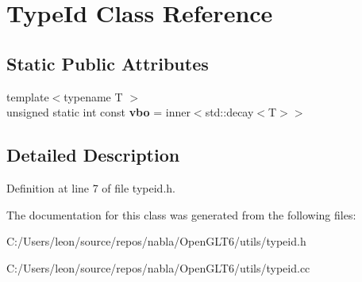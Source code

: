 \hypertarget{class_type_id}{}\section{Type\+Id Class Reference}
\label{class_type_id}
\subsection*{Static Public Attributes}
\begin{DoxyCompactItemize}
\item 
\mbox{\label{class_type_id_abf385f40cbb873ea099a0a9f9c4339d5}} 
{\footnotesize template$<$typename T $>$ }\\unsigned static int const {\bfseries vbo} = inner$<$std\+::decay$<$T$>$$>$
\end{DoxyCompactItemize}


\subsection{Detailed Description}


Definition at line 7 of file typeid.\+h.



The documentation for this class was generated from the following files\+:\begin{DoxyCompactItemize}
\item 
C\+:/\+Users/leon/source/repos/nabla/\+Open\+G\+L\+T6/utils/typeid.\+h\item 
C\+:/\+Users/leon/source/repos/nabla/\+Open\+G\+L\+T6/utils/typeid.\+cc\end{DoxyCompactItemize}
